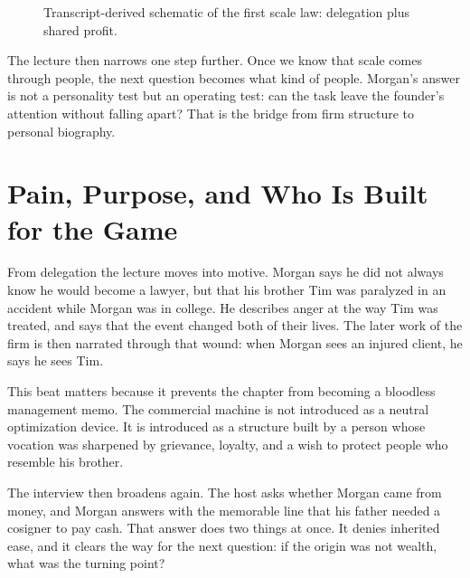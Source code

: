 \begin{figure}
\centering
{}
\caption{Transcript-derived schematic of the first scale law: delegation plus shared profit.}
\label{fig:delegation-scale}
\end{figure}

The lecture then narrows one step further. Once we know that scale comes through people, the next question becomes what kind of people. Morgan's answer is not a personality test but an operating test: can the task leave the founder's attention without falling apart? That is the bridge from firm structure to personal biography.

\section{Pain, Purpose, and Who Is Built for the Game}

From delegation the lecture moves into motive. Morgan says he did not always know he would become a lawyer, but that his brother Tim was paralyzed in an accident while Morgan was in college. He describes anger at the way Tim was treated, and says that the event changed both of their lives. The later work of the firm is then narrated through that wound: when Morgan sees an injured client, he says he sees Tim.

This beat matters because it prevents the chapter from becoming a bloodless management memo. The commercial machine is not introduced as a neutral optimization device. It is introduced as a structure built by a person whose vocation was sharpened by grievance, loyalty, and a wish to protect people who resemble his brother.

The interview then broadens again. The host asks whether Morgan came from money, and Morgan answers with the memorable line that his father needed a cosigner to pay cash. That answer does two things at once. It denies inherited ease, and it clears the way for the next question: if the origin was not wealth, what was the turning point?


